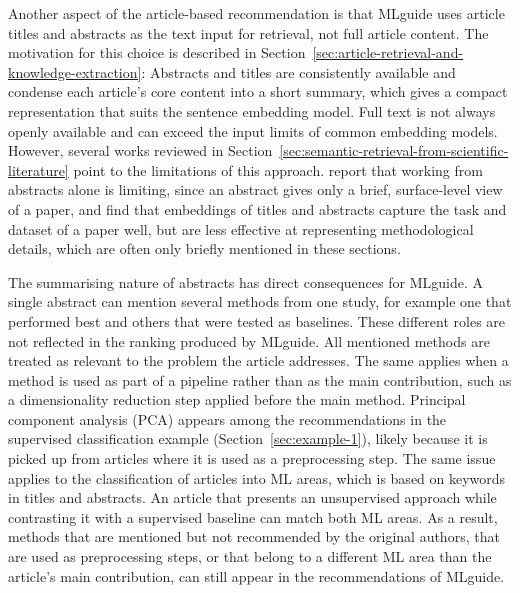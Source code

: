 Another aspect of the article-based recommendation is that 
MLguide uses article titles and abstracts as the text input for 
retrieval, not full article content. The motivation for this 
choice is described in 
Section~\ref{sec:article-retrieval-and-knowledge-extraction}: 
Abstracts and titles are consistently available and condense each 
article's core content into a short summary, which gives a compact 
representation that suits the sentence embedding model. Full text is 
not always openly available and can exceed the input limits of common 
embedding models. However, several works reviewed in 
Section~\ref{sec:semantic-retrieval-from-scientific-literature} 
point to the limitations of this approach. 
\textcite{park2026chain_of_retrieval} report that working from abstracts
alone is limiting, since an abstract gives only a brief, surface-level
view of a paper, and 
\textcite{ostendorff2022_aspect_based_embeddings} find that 
embeddings of titles and abstracts capture the task and dataset of a 
paper well, but are less effective at representing methodological details, 
which are often only briefly mentioned in these sections.

The summarising nature of abstracts has direct consequences for 
MLguide. A single abstract can mention several methods from one 
study, for example one that performed best and others that were 
tested as baselines. These different roles are not reflected in 
the ranking produced by MLguide. All mentioned methods are treated as 
relevant to the problem the article addresses. The same applies 
when a method is used as part of a pipeline 
rather than as the main contribution, such as a dimensionality 
reduction step applied before the main method. Principal component 
analysis (PCA) appears among the recommendations in the supervised 
classification example (Section~\ref{sec:example-1}), likely 
because it is picked up from articles where it is used as a 
preprocessing step. The same 
issue applies to the classification of articles into ML areas, 
which is based on keywords in titles and abstracts. An article 
that presents an unsupervised approach while contrasting it 
with a supervised baseline can match both ML areas. As a 
result, methods that are mentioned but not recommended by the 
original authors, that are used as preprocessing steps, or 
that belong to a different ML area than the article's main 
contribution, can still appear in the recommendations of MLguide.

